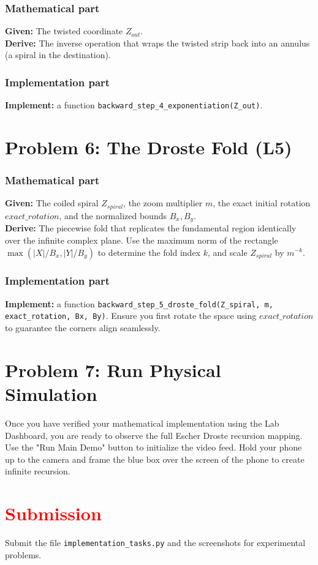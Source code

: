 \documentclass[11pt]{article}
\begin{document}
\subsubsection*{Mathematical part}
\textbf{Given:} The twisted coordinate $Z_{out}$. \\
\textbf{Derive:} The inverse operation that wraps the twisted strip back into an annulus (a spiral in the destination). 

\subsubsection*{Implementation part}
\textbf{Implement:} a function \lstinline|backward_step_4_exponentiation(Z_out)|.

\section*{Problem 6: The Droste Fold (L5)}

\subsubsection*{Mathematical part}
\textbf{Given:} The coiled spiral $Z_{spiral}$, the zoom multiplier $m$, the exact initial rotation $exact\_rotation$, and the normalized bounds $B_x, B_y$. \\
\textbf{Derive:} The piecewise fold that replicates the fundamental region identically over the infinite complex plane. Use the maximum norm of the rectangle $\max(|X|/B_x, |Y|/B_y)$ to determine the fold index $k$, and scale $Z_{spiral}$ by $m^{-k}$.

\subsubsection*{Implementation part}
\textbf{Implement:} a function \lstinline|backward_step_5_droste_fold(Z_spiral, m, exact_rotation, Bx, By)|. Ensure you first rotate the space using $exact\_rotation$ to guarantee the corners align seamlessly.

\section*{Problem 7: Run Physical Simulation}

Once you have verified your mathematical implementation using the Lab Dashboard, you are ready to observe the full Escher Droste recursion mapping. Use the "Run Main Demo" button to initialize the video feed. Hold your phone up to the camera and frame the blue box over the screen of the phone to create infinite recursion.

\section*{\textcolor{red}{Submission}}

Submit the file \texttt{implementation\_tasks.py} and the screenshots for experimental problems.
\end{document}
